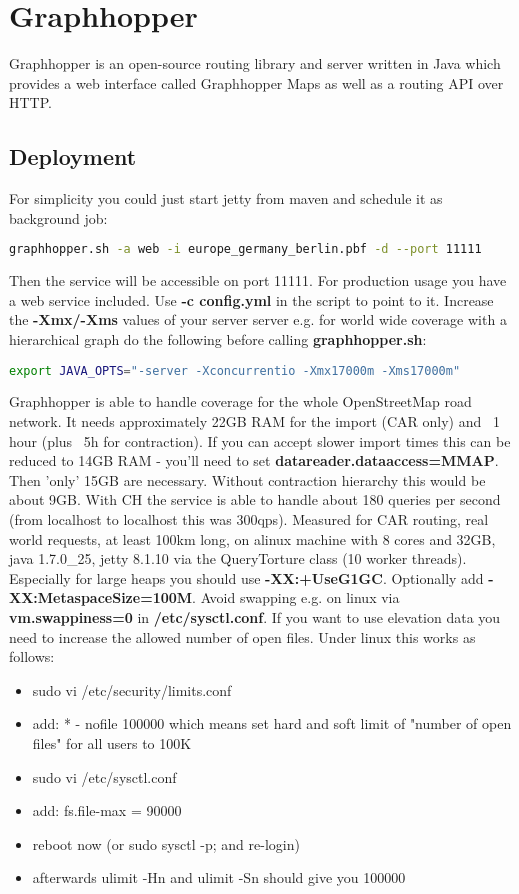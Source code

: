 
\section{Graphhopper}\label{sec:graph}

Graphhopper is an open-source routing library and server written in Java which provides a web
interface called Graphhopper Maps as well as a routing API over HTTP.
\subsection{Deployment}
For simplicity you could just start jetty from maven and schedule it as background job: 
\begin{lstlisting}[language=bash,breaklines=true]
graphhopper.sh -a web -i europe_germany_berlin.pbf -d --port 11111
\end{lstlisting}
Then the service will be accessible on port 11111.
For production usage you have a web service included. Use \textbf{-c config.yml} in the script to point to
it. Increase the \textbf{-Xmx/-Xms} values of your server server e.g. for world wide coverage with a
hierarchical graph do the following before calling \textbf{graphhopper.sh}:
\begin{lstlisting}[language=bash,breaklines=true]
export JAVA_OPTS="-server -Xconcurrentio -Xmx17000m -Xms17000m"
\end{lstlisting}
Graphhopper is able to handle coverage for the whole OpenStreetMap road network. It needs
approximately 22GB RAM for the import (CAR only) and ~1 hour (plus ~5h for contraction). If
you can accept slower import times this can be reduced to 14GB RAM - you'll need to set
\textbf{datareader.dataaccess=MMAP}. Then 'only' 15GB are necessary. Without contraction hierarchy this would be about 9GB. With CH the service is able to handle about 180 queries per second (from localhost to localhost this was 300qps). Measured for CAR routing, real world requests, at least 100km long, on alinux machine with 8 cores and 32GB, java 1.7.0\_25, jetty 8.1.10 via the QueryTorture class (10
worker threads).\\
Especially for large heaps you should use \textbf{-XX:+UseG1GC}. Optionally add \textbf{-XX:MetaspaceSize=100M}.
Avoid swapping e.g. on linux via \textbf{vm.swappiness=0} in \textbf{/etc/sysctl.conf}.
If you want to use elevation data you need to increase the allowed number of open files. Under
linux this works as follows:
\begin{itemize}
\item sudo vi /etc/security/limits.conf
\item add: * - nofile 100000 which means set hard and soft limit of "number of open files" for all users to 100K
\item sudo vi /etc/sysctl.conf
\item add: fs.file-max = 90000
\item reboot now (or sudo sysctl -p; and re-login)
\item afterwards ulimit -Hn and ulimit -Sn should give you 100000
\end{itemize}
